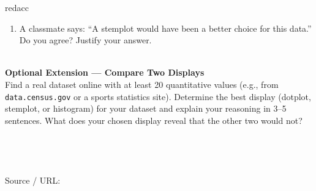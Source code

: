 \documentclass[10pt]{article}
\begin{document}
\begin{blurbbox}{redacc}
\begin{enumerate}[leftmargin=1.5em, itemsep=10pt]
  \item A classmate says: ``A stemplot would have been a better choice for this
        data.'' Do you agree? Justify your answer.\\[6pt]
        \writeline\\[1pt]\writeline

\end{enumerate}

\end{blurbbox}

\vspace{0.12in}

\begin{extensionbox}
\small
\textbf{Optional Extension --- Compare Two Displays}\\[4pt]
Find a real dataset online with at least 20 quantitative values (e.g., from
\texttt{data.census.gov} or a sports statistics site). Determine the best
display (dotplot, stemplot, or histogram) for your dataset and explain your
reasoning in 3--5 sentences. What does your chosen display reveal that the
other two would not?\\[8pt]
\writeline\\[1pt]\writeline\\[1pt]\writeline\\[1pt]\writeline\\[1pt]\writeline
\vspace{4pt}
\textcolor{slate}{\scriptsize Source / URL:\;\blank{11cm}}
\end{extensionbox}
\end{document}
